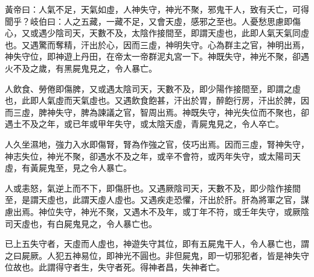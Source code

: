 黃帝曰：人氣不足，天氣如虛，人神失守，神光不聚，邪鬼干人，致有夭亡，可得聞乎？岐伯曰：人之五藏，一藏不足，又會天虛，感邪之至也。人憂愁思慮即傷心，又或遇少陰司天，天數不及，太陰作接間至，即謂天虛也，此即人氣天氣同虛也。又遇驚而奪精，汗出於心，因而三虛，神明失守。心為群主之官，神明出焉，神失守位，即神遊上丹田，在帝太一帝群泥丸宮一下。神既失守，神光不聚，卻遇火不及之歲，有黑屍鬼見之，令人暴亡。

人飲食、勞倦即傷脾，又或遇太陰司天，天數不及，即少陽作接間至，即謂之虛也，此即人氣虛而天氣虛也。又遇飲食飽甚，汗出於胃，醉飽行房，汗出於脾，因而三虛，脾神失守，脾為諫議之官，智周出焉。神既失守，神光失位而不聚也，卻遇土不及之年，或已年或甲年失守，或太陰天虛，青屍鬼見之，令人卒亡。

人久坐濕地，強力入水即傷腎，腎為作強之官，伎巧出焉。因而三虛，腎神失守，神志失位，神光不聚，卻遇水不及之年，或辛不會符，或丙年失守，或太陽司天虛，有黃屍鬼至，見之令人暴亡。

人或恚怒，氣逆上而不下，即傷肝也。又遇厥陰司天，天數不及，即少陰作接間至，是謂天虛也，此謂天虛人虛也。又遇疾走恐懼，汗出於肝。肝為將軍之官，謀慮出焉。神位失守，神光不聚，又遇木不及年，或丁年不符，或壬年失守，或厥陰司天虛也，有白屍鬼見之，令人暴亡也。

已上五失守者，天虛而人虛也，神遊失守其位，即有五屍鬼干人，令人暴亡也，謂之曰屍厥。人犯五神易位，即神光不圓也。非但屍鬼，即一切邪犯者，皆是神失守位故也。此謂得守者生，失守者死。得神者昌，失神者亡。
